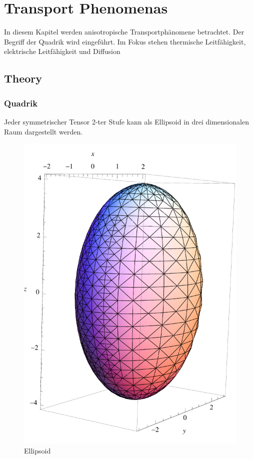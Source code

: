 \documentclass[a4paper]{scrartcl}
\begin{document}
\section{Transport Phenomenas}
In diesem Kapitel werden anisotropische Transportphänomene betrachtet. Der
Begriff der Quadrik wird eingeführt. Im Fokus stehen thermische Leitfähigkeit,
elektrische Leitfähigkeit und Diffusion
\subsection{Theory}
\subsubsection{Quadrik}
Jeder symmetrischer Tensor 2-ter Stufe kann als Ellipsoid in drei dimensionalen
Raum dargestellt werden.

\begin{figure}[h]
\begin{center}
\includegraphics[scale=0.5]{images/ellipsoid.pdf}
\caption{Ellipsoid}
\label{fig:ellipsoid}
\end{center}
\end{figure}
\end{document}
